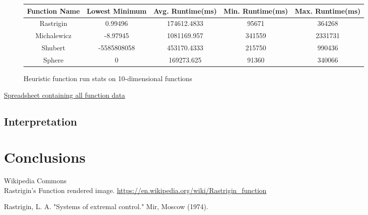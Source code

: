 \documentclass{article}
\begin{document}
\begin{figure}[H]
\begin{tabular}{|c||c|c|c|c|}
  \hline
  Function Name & Lowest Minimum & Avg. Runtime(ms) & Min. Runtime(ms) & Max. Runtime(ms) \\ \hline \hline
  Rastrigin & 0.99496 & 174612.4833 & 95671 & 364268 \\ \hline
  Michalewicz & -8.97945 & 1081169.957 & 341559 & 2331731 \\ \hline
  Shubert & -5585808058 & 453170.4333 & 215750 & 990436 \\ \hline
  Sphere & 0 & 169273.625 & 91360 & 340066 \\ \hline
\end{tabular}
\caption{Heuristic function run stats on 10-dimensional functions}
\end{figure}

\href{./h0data.xlsx}{Spreadsheet containing all function data}

\subsection{Interpretation}

\section{Conclusions}



\begin{thebibliography}{9}

  Wikipedia Commons \\ Rastrigin's Function rendered image.
  \url{https://en.wikipedia.org/wiki/Rastrigin_function}

  Rastrigin, L. A. "Systems of extremal control." Mir, Moscow (1974).
\end{thebibliography}  
\end{document}
